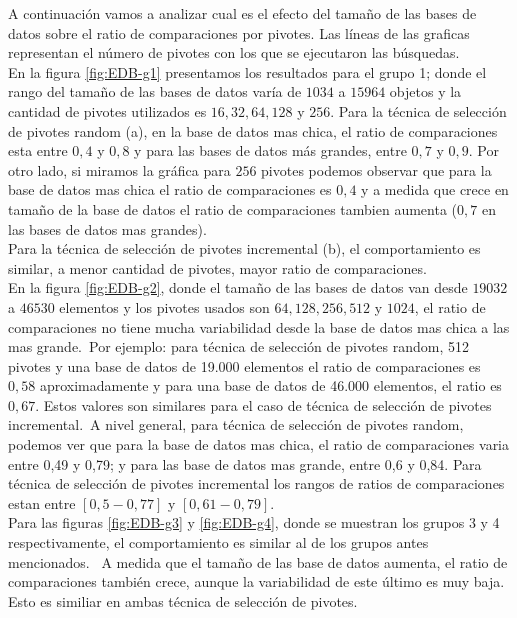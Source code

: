 A continuaci\'on vamos a analizar cual es el efecto del tama\~no de las bases de datos sobre el ratio de comparaciones por pivotes. Las l\'ineas de las graficas representan el n\'umero de pivotes con los que se ejecutaron las b\'usquedas.\\

En la figura \ref{fig:EDB-g1} presentamos los resultados para el grupo 1; donde el rango del tama\~no de las bases de datos varía de $1034$ a $15964$ objetos y la cantidad de pivotes utilizados es $16, 32, 64, 128$ y $256$. Para la t\'ecnica de selecci\'on de pivotes random (a), en la base de datos mas chica, el ratio de comparaciones esta entre $0,4$ y $0,8$ y para las bases de datos m\'as grandes, entre $0,7$ y $0,9$. Por otro lado, si miramos la gr\'afica para $256$ pivotes podemos observar que para la base de datos mas chica el ratio de comparaciones es $0,4$ y a medida que crece en tama\~no de la base de datos el ratio de comparaciones tambien aumenta ($0,7$ en las bases de datos mas grandes).\\

Para la t\'ecnica de selecci\'on de pivotes incremental (b), el comportamiento es similar, a menor cantidad de pivotes, mayor ratio de comparaciones.\\

En la figura \ref{fig:EDB-g2}, donde el tama\~no de las bases de datos van desde $19032$ a $46530$ elementos y los pivotes usados son $64, 128, 256, 512$ y $1024$, el ratio de comparaciones no tiene mucha variabilidad desde la base de datos mas chica a las mas grande.\
Por ejemplo: para t\'ecnica de selecci\'on de pivotes random, 512 pivotes y una base de datos de 19.000 elementos el ratio de comparaciones es $0,58$ aproximadamente y para una base de datos de 46.000 elementos, el ratio es $0,67$. Estos valores son similares para el caso de t\'ecnica de selecci\'on de pivotes incremental.\
A nivel general, para t\'ecnica de selecci\'on de pivotes random, podemos ver que para la base de datos mas chica, el ratio de comparaciones varia entre 0,49 y 0,79; y para las base de datos mas grande, entre 0,6 y 0,84. Para t\'ecnica de selecci\'on de pivotes incremental los rangos de ratios de comparaciones estan entre $[0,5 - 0,77]$ y $[0,61 - 0,79]$. \\

Para las figuras \ref{fig:EDB-g3} y \ref{fig:EDB-g4}, donde se muestran los grupos 3 y 4 respectivamente, el comportamiento es similar al de los grupos antes mencionados.	\
A medida que el tama\~no de las base de datos aumenta, el ratio de comparaciones tambi\'en crece, aunque la variabilidad de este \'ultimo es muy baja. Esto es similiar en ambas  t\'ecnica de selecci\'on de pivotes.


